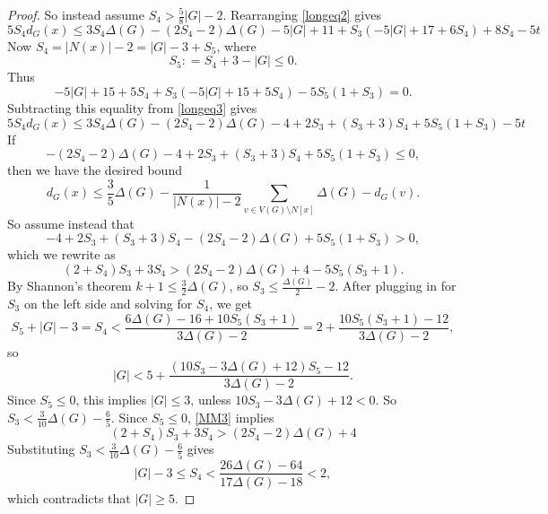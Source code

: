 \documentclass[12pt]{article}
\theoremstyle{plain}
\theoremstyle{definition}
\theoremstyle{remark}
\newcommand{\card}[1]{\left|#1\right|}
\newcommand{\DefinedAs}{\mathrel{\mathop:}=}
\begin{document}
\begin{proof}
So instead assume $S_4 > \frac58\card{G} - 2$. Rearranging \eqref{longeq2} gives 
\begin{equation}\label{longeq3}
5S_4d_G(x) \le 3S_4\Delta(G) - (2S_4-2)\Delta(G) - 5\card{G} + 11 +
S_3(-5\card{G} + 17 + 6S_4) + 8S_4 - 5t
\end{equation}
Now $S_4 = \card{N(x)} - 2 = \card{G} - 3 + S_5$, where
\[S_5 \DefinedAs S_4 + 3 - \card{G} \le 0.\]
Thus
\[-5\card{G} + 15 + 5S_4 +S_3(-5\card{G} + 15 + 5S_4) - 5S_5(1 + S_3) = 0.\]
Subtracting this equality from \eqref{longeq3} gives
\begin{equation}\label{longeq4}
5S_4d_G(x) \le 3S_4\Delta(G) - (2S_4-2)\Delta(G) - 4 + 2S_3 + (S_3 + 3)S_4 + 5S_5(1 + S_3) - 5t 
\end{equation}
If
\[- (2S_4-2)\Delta(G) -4 + 2S_3 + (S_3 + 3)S_4 + 5S_5(1 + S_3) \le 0,\]
then we have the desired bound
\[d_G(x) \le \frac{3}{5}\Delta(G) - \frac{1}{\card{N(x)} - 2}\sum_{v \in V(G)\setminus N[x]} \Delta(G) - d_G(v).\]
So assume instead that
\[-4 + 2S_3 + (S_3 + 3)S_4 - (2S_4-2)\Delta(G) + 5S_5(1 + S_3) > 0,\]
which we rewrite as
\begin{equation}\label{MM3}
(2 + S_4)S_3 + 3S_4 > (2S_4-2)\Delta(G) + 4 - 5S_5(S_3 + 1).
\end{equation}
By Shannon's theorem $k + 1 \le \frac32\Delta(G)$, so $S_3 \le \frac{\Delta(G)}{2} - 2$. After plugging in for $S_3$ on the left side and solving for $S_4$, we get
\[S_5 + \card{G} - 3 = S_4 < \frac{6\Delta(G) - 16 + 10S_5(S_3+1)}{3\Delta(G) -
2} = 2 + \frac{10S_5(S_3 + 1) - 12}{3\Delta(G) - 2},\]
so
\[\card{G} < 5 + \frac{(10S_3 - 3\Delta(G) + 12)S_5 - 12}{3\Delta(G) - 2}.\]
Since $S_5 \le 0$, this implies $\card{G} \le 3$, unless $10S_3 - 3\Delta(G) + 12 < 0$.  So $S_3 < \frac{3}{10}\Delta(G) - \frac65$. 
Since $S_5 \le 0$, \eqref{MM3} implies
\[(2 + S_4)S_3 + 3S_4 > (2S_4-2)\Delta(G) + 4\]
Substituting $S_3 < \frac{3}{10}\Delta(G)-\frac65$ gives
\[\card{G} - 3 \le S_4 < \frac{26\Delta(G) - 64}{17\Delta(G) - 18} < 2,\]
which contradicts that $\card{G}\ge 5$.
\end{proof}
\end{document}
